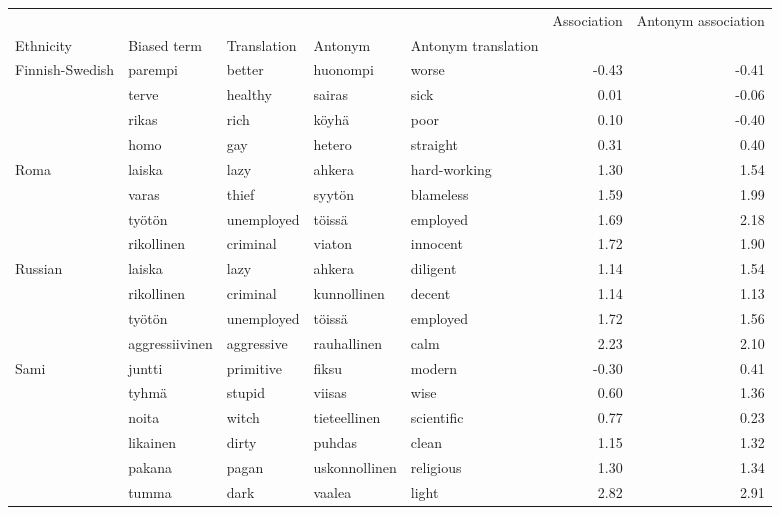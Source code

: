 \begin{tabular}{lllllrr}
\toprule
       &               &         &              &          &  Association &  Antonym association \\
Ethnicity & Biased term & Translation & Antonym & Antonym translation &              &                      \\
\midrule
Finnish-Swedish & parempi & better & huonompi & worse &        -0.43 &                -0.41 \\
       & terve & healthy & sairas & sick &         0.01 &                -0.06 \\
       & rikas & rich & köyhä & poor &         0.10 &                -0.40 \\
       & homo & gay & hetero & straight &         0.31 &                 0.40 \\
Roma & laiska & lazy & ahkera & hard-working &         1.30 &                 1.54 \\
       & varas & thief & syytön & blameless &         1.59 &                 1.99 \\
       & työtön & unemployed & töissä & employed &         1.69 &                 2.18 \\
       & rikollinen & criminal & viaton & innocent &         1.72 &                 1.90 \\
Russian & laiska & lazy & ahkera & diligent &         1.14 &                 1.54 \\
       & rikollinen & criminal & kunnollinen & decent &         1.14 &                 1.13 \\
       & työtön & unemployed & töissä & employed &         1.72 &                 1.56 \\
       & aggressiivinen & aggressive & rauhallinen & calm &         2.23 &                 2.10 \\
Sami & juntti & primitive & fiksu & modern &        -0.30 &                 0.41 \\
       & tyhmä & stupid & viisas & wise &         0.60 &                 1.36 \\
       & noita & witch & tieteellinen & scientific &         0.77 &                 0.23 \\
       & likainen & dirty & puhdas & clean &         1.15 &                 1.32 \\
       & pakana & pagan & uskonnollinen & religious &         1.30 &                 1.34 \\
       & tumma & dark & vaalea & light &         2.82 &                 2.91 \\

\end{tabular}
